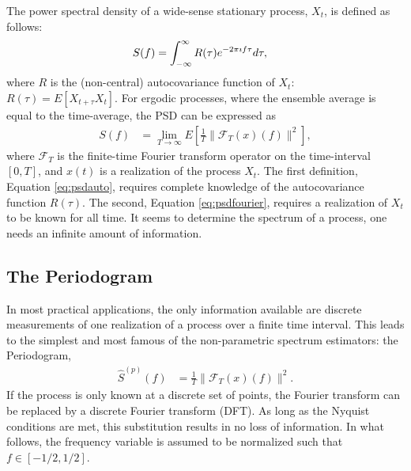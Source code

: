 
The power spectral density of a wide-sense stationary process, $X_t$, is defined as follows:
\begin{align}
    S(f) & = \int_{-\infty}^{\infty}R(\tau)e^{-2\pi\imath f \tau}d\tau, \label{eq:psdauto} \index{power spectral density}
\end{align}
where $R$ is the (non-central) autocovariance function of $X_t$: $R(\tau)=E[X_{t+\tau} X_t]$.  For ergodic processes, where the ensemble average is equal to the time-average, the PSD can be expressed as
\begin{align}
    S(f) & = \lim_{T\to\infty}E\left[\frac{1}{T}\|\mathcal{F}_T(x)(f)\|^2\right], \label{eq:psdfourier}
\end{align}
where $\mathcal{F}_T$ is the finite-time Fourier transform operator on the time-interval $[0,T]$, and $x(t)$ is a realization of the process $X_t$.  The first definition, Equation \eqref{eq:psdauto}, requires complete knowledge of the autocovariance function $R(\tau)$.  The second, Equation \eqref{eq:psdfourier}, requires a realization of $X_t$ to be known for all time.  It seems to determine the spectrum of a process, one needs an infinite amount of information. 

\subsection{The Periodogram}

In most practical applications, the only information available are discrete measurements of one realization of a process over a finite time interval.  This leads to the simplest and most famous of the non-parametric spectrum estimators: the Periodogram,
\begin{align}
    \hat{S}^{(p)}(f) & = \frac{1}{T}\|\mathcal{F}_T(x)(f)\|^2.
\end{align}
If the process is only known at a discrete set of points, the Fourier transform can be replaced by a discrete Fourier transform (DFT).  As long as the Nyquist conditions are met, this substitution results in no loss of information.  In what follows, the frequency variable is assumed to be normalized such that $f\in[-1/2,1/2]$.  

